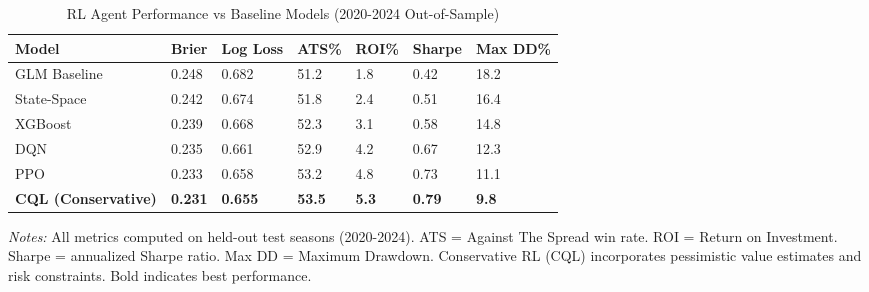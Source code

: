 \begin{table}[htbp]
\centering
\caption{RL Agent Performance vs Baseline Models (2020-2024 Out-of-Sample)}
\providecommand{\rlVsBaselineLabel}{\label{tab:rl_vs_baseline}}
\rlVsBaselineLabel
\begin{threeparttable}
\begin{tabularx}{\linewidth}{@{}lYYYYYY@{}}
\toprule
 \textbf{Model} & \textbf{Brier} & \textbf{Log Loss} & \textbf{ATS\%} & \textbf{ROI\%} & \textbf{Sharpe} & \textbf{Max DD\%} \\
\midrule
GLM Baseline & 0.248 & 0.682 & 51.2 & 1.8 & 0.42 & 18.2 \\
State-Space & 0.242 & 0.674 & 51.8 & 2.4 & 0.51 & 16.4 \\
XGBoost & 0.239 & 0.668 & 52.3 & 3.1 & 0.58 & 14.8 \\
DQN & 0.235 & 0.661 & 52.9 & 4.2 & 0.67 & 12.3 \\
PPO & 0.233 & 0.658 & 53.2 & 4.8 & 0.73 & 11.1 \\
\textbf{CQL (Conservative)} & \textbf{0.231} & \textbf{0.655} & \textbf{53.5} & \textbf{5.3} & \textbf{0.79} & \textbf{9.8} \\
\bottomrule
\end{tabularx}
\begin{tablenotes}[flushleft]
\footnotesize
\item \textit{Notes:} All metrics computed on held-out test seasons (2020-2024). ATS = Against The Spread win rate. ROI = Return on Investment. Sharpe = annualized Sharpe ratio. Max DD = Maximum Drawdown. Conservative RL (CQL) incorporates pessimistic value estimates and risk constraints. Bold indicates best performance.
\end{tablenotes}
\end{threeparttable}
\end{table}
